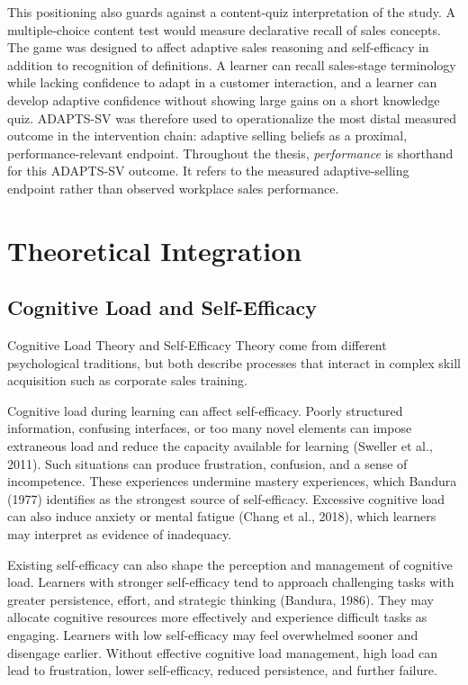 \documentclass[12pt]{report}
\begin{document}
This positioning also guards against a content-quiz interpretation of the study. A multiple-choice content test would measure declarative recall of sales concepts. The game was designed to affect adaptive sales reasoning and self-efficacy in addition to recognition of definitions. A learner can recall sales-stage terminology while lacking confidence to adapt in a customer interaction, and a learner can develop adaptive confidence without showing large gains on a short knowledge quiz. ADAPTS-SV was therefore used to operationalize the most distal measured outcome in the intervention chain: adaptive selling beliefs as a proximal, performance-relevant endpoint. Throughout the thesis, \textit{performance} is shorthand for this ADAPTS-SV outcome. It refers to the measured adaptive-selling endpoint rather than observed workplace sales performance.

\section{Theoretical Integration}

\subsection{Cognitive Load and Self-Efficacy}
Cognitive Load Theory and Self-Efficacy Theory come from different psychological traditions, but both describe processes that interact in complex skill acquisition such as corporate sales training.

Cognitive load during learning can affect self-efficacy. Poorly structured information, confusing interfaces, or too many novel elements can impose extraneous load and reduce the capacity available for learning (Sweller et al., 2011). Such situations can produce frustration, confusion, and a sense of incompetence. These experiences undermine mastery experiences, which Bandura (1977) identifies as the strongest source of self-efficacy. Excessive cognitive load can also induce anxiety or mental fatigue (Chang et al., 2018), which learners may interpret as evidence of inadequacy.

Existing self-efficacy can also shape the perception and management of cognitive load. Learners with stronger self-efficacy tend to approach challenging tasks with greater persistence, effort, and strategic thinking (Bandura, 1986). They may allocate cognitive resources more effectively and experience difficult tasks as engaging. Learners with low self-efficacy may feel overwhelmed sooner and disengage earlier. Without effective cognitive load management, high load can lead to frustration, lower self-efficacy, reduced persistence, and further failure.
\end{document}
